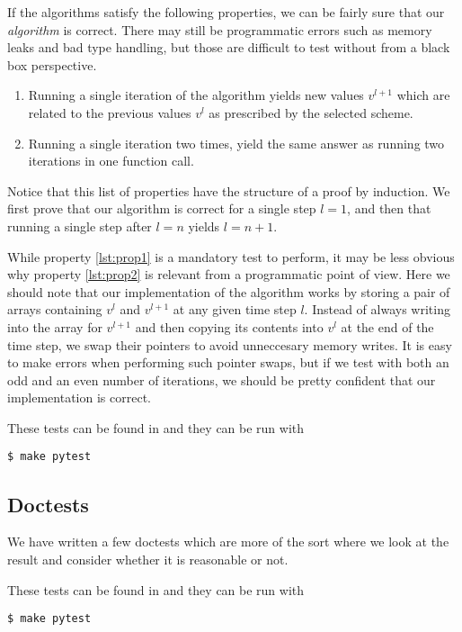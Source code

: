 If the algorithms satisfy the following properties, we can be fairly sure that our \emph{algorithm} is correct. There may still be programmatic errors such as memory leaks and bad type handling, but those are difficult to test without from a black box perspective.
\begin{enumerate}[label=(\roman*)]
    \item Running a single iteration of the algorithm yields new values $v^{l+1}$ which are related to the previous values $v^l$ as prescribed by the selected scheme. \label{lst:prop1}
    \item Running a single iteration two times, yield the same answer as running two iterations in one function call.\label{lst:prop2}
\end{enumerate}

Notice that this list of properties have the structure of a proof by induction. We first prove that our algorithm is correct for a single step $l = 1$, and then that running a single step after $l = n$ yields $l = n+1$.

While property \ref{lst:prop1} is a mandatory test to perform, it may be less obvious why property \ref{lst:prop2} is relevant from a programmatic point of view. Here we should note that our implementation of the algorithm works by storing a pair of arrays containing $v^l$ and $v^{l+1}$ at any given time step $l$. Instead of always writing into the array for $v^{l+1}$ and then copying its contents into $v^l$ at the end of the time step, we swap their pointers to avoid unneccesary memory writes. It is easy to make errors when performing such pointer swaps, but if we test with both an odd and an even number of iterations, we should be pretty confident that our implementation is correct.

These tests can be found in  and they can be run with
\begin{verbatim}
$ make pytest
\end{verbatim}

\subsection{Doctests}
\label{appx:testing:doctests}
We have written a few doctests which are more of the sort where we look at the result and consider whether it is reasonable or not.

These tests can be found in  and they can be run with
\begin{verbatim}
$ make pytest
\end{verbatim}


